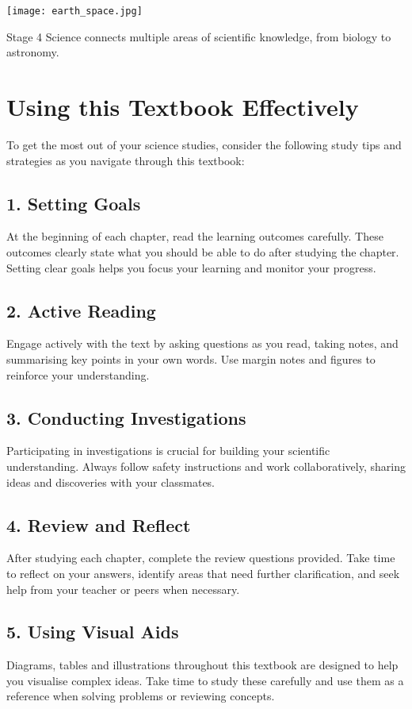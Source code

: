 \begin{marginfigure}[0pt]
    \texttt{[image: earth\_space.jpg]}
    \caption{Stage 4 Science connects multiple areas of scientific knowledge, from biology to astronomy.}
\end{marginfigure}

\FloatBarrier

\section{Using this Textbook Effectively}

To get the most out of your science studies, consider the following study tips and strategies as you navigate through this textbook:

\subsection*{1. Setting Goals}
At the beginning of each chapter, read the learning outcomes carefully. These outcomes clearly state what you should be able to do after studying the chapter. Setting clear goals helps you focus your learning and monitor your progress.

\subsection*{2. Active Reading}
Engage actively with the text by asking questions as you read, taking notes, and summarising key points in your own words. Use margin notes and figures to reinforce your understanding.

\subsection*{3. Conducting Investigations}
Participating in investigations is crucial for building your scientific understanding. Always follow safety instructions and work collaboratively, sharing ideas and discoveries with your classmates.

\subsection*{4. Review and Reflect}
After studying each chapter, complete the review questions provided. Take time to reflect on your answers, identify areas that need further clarification, and seek help from your teacher or peers when necessary.

\subsection*{5. Using Visual Aids}
Diagrams, tables and illustrations throughout this textbook are designed to help you visualise complex ideas. Take time to study these carefully and use them as a reference when solving problems or reviewing concepts.

